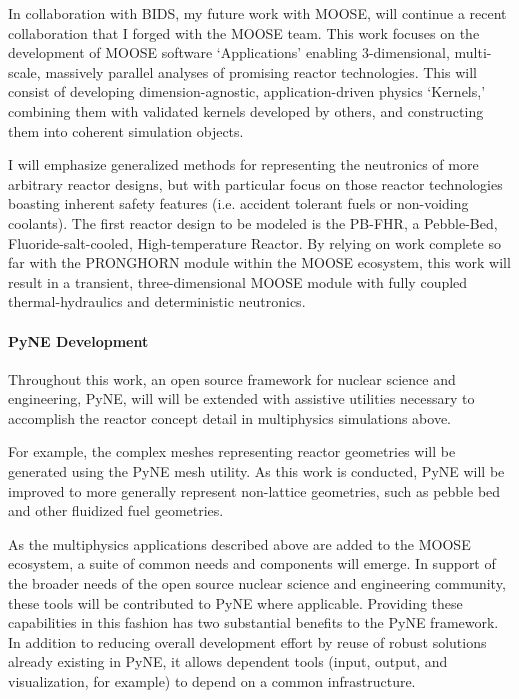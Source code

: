 \documentclass[a4paper, 10pt]{article}
\begin{document}
In collaboration with BIDS, my future work with MOOSE, will continue a recent 
collaboration that I forged with the MOOSE team. This work focuses on the 
development of MOOSE software `Applications' enabling 3-dimensional, 
multi-scale, massively parallel analyses of promising reactor technologies. This 
will consist of developing dimension-agnostic, application-driven physics 
`Kernels,' combining them with validated kernels developed by others, and 
constructing them into coherent simulation objects. 

I will emphasize generalized methods for representing the neutronics of more 
arbitrary reactor designs, but with particular focus on those reactor 
technologies boasting inherent safety features (i.e. accident tolerant fuels or 
non-voiding coolants).  The first reactor design to be modeled is the PB-FHR, a 
Pebble-Bed, Fluoride-salt-cooled, High-temperature Reactor.  By relying on work 
complete so far with the PRONGHORN module within the MOOSE ecosystem, this work 
will result in a transient, three-dimensional MOOSE module with fully coupled 
thermal-hydraulics and deterministic neutronics.  

\paragraph{PyNE Development}
Throughout this work, an open source framework for nuclear science and
engineering, PyNE, will will be extended with assistive utilities necessary to
accomplish the reactor concept detail in multiphysics simulations above. 

For example, the complex meshes representing reactor geometries will be
generated using the PyNE mesh utility. As this work is conducted, PyNE will be
improved to more generally represent non-lattice geometries, such as pebble bed
and other fluidized fuel geometries. 

As the multiphysics applications described above are added to the MOOSE
ecosystem, a suite of common needs and components will emerge.  In support of
the broader needs of the open source nuclear science and engineering community,
these tools will be contributed to PyNE where applicable.  Providing these
capabilities in this fashion has two substantial benefits to the PyNE
framework.  In addition to reducing overall development effort by reuse of
robust solutions already existing in PyNE, it allows dependent tools (input,
output, and visualization, for example) to depend on a common infrastructure.
\end{document}
